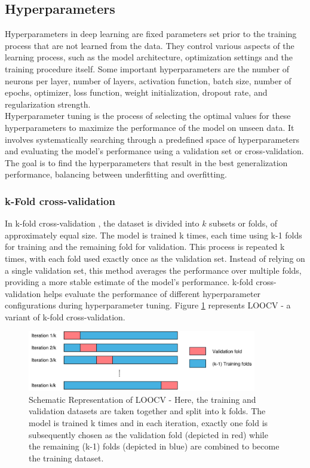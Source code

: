 \subsection{Hyperparameters}\label{section:hyperparameters}
Hyperparameters in deep learning are fixed parameters set prior to the training process that are not learned from the data. They control various aspects of the learning process, such as the model architecture, optimization settings and the training procedure itself. Some important hyperparameters are the number of neurons per layer, number of layers, activation function, batch size, number of epochs, optimizer, loss function, weight initialization, dropout rate, and regularization strength. \\
Hyperparameter tuning is the process of selecting the optimal values for these hyperparameters to maximize the performance of the model on unseen data. It involves systematically searching through a predefined space of hyperparameters and evaluating the model's performance using a validation set or cross-validation. The goal is to find the hyperparameters that result in the best generalization performance, balancing between underfitting and overfitting.
\subsubsection{k-Fold cross-validation}
In k-fold cross-validation \cite{cv}, the dataset is divided into $k$ subsets or folds, of approximately equal size. The model is trained k times, each time using k-1 folds for training and the remaining fold for validation. This process is repeated k times, with each fold used exactly once as the validation set.  Instead of relying on a single validation set, this method averages the performance over multiple folds, providing a more stable estimate of the model's performance. k-fold cross-validation helps evaluate the performance of different hyperparameter configurations during hyperparameter tuning. Figure \ref{fig:crossval} represents \gls{LOOCV} - a variant of k-fold cross-validation. 
\begin{figure}[ht]
  \centering
  \includegraphics[width=10cm]{images/Theory-DL/crossval.png}
  \caption{Schematic Representation of LOOCV - Here, the training and validation datasets are taken together and split into k folds. The model is trained k times and in each iteration, exactly one fold is subsequently chosen as the validation fold (depicted in red) while the remaining (k-1) folds (depicted in blue) are combined to become the training dataset.}
  \label{fig:crossval}
\end{figure}
